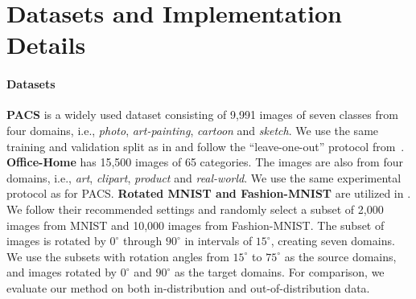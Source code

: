 \documentclass{article} \usepackage[table]{xcolor}
\begin{document}
\section{Datasets and Implementation Details}
\label{appimp}

\paragraph{Datasets}
\textbf{PACS} \citep{li2017deeper} is a widely used dataset consisting of 9,991 images of seven classes from four domains, i.e., \textit{photo}, \textit{art-painting}, \textit{cartoon} and \textit{sketch}. We use the same training and validation split as in \citep{li2017deeper} and follow the ``leave-one-out'' protocol from~\citep{li2017deeper,li2019episodic,carlucci2019domain}. 
\textbf{Office-Home} \citep{venkateswara2017deep} has 15,500 images of 65 categories. The images are also from four domains, i.e., \textit{art}, \textit{clipart}, \textit{product} and \textit{real-world}. We use the same experimental protocol as for PACS. 
\textbf{Rotated MNIST and Fashion-MNIST} are utilized in \cite{piratla2020efficient}.
We follow their recommended settings and randomly select a subset of 2,000 images from MNIST and 10,000 images from Fashion-MNIST. The subset of images is rotated by $0^\circ$ through $90^\circ$ in intervals of $15^\circ$, creating seven domains. We use the subsets with rotation angles from $15^\circ$ to $75^\circ$ as the source domains, and images rotated by $0^\circ$ and $90^\circ$ as the target domains. 
For comparison, we evaluate our method on both in-distribution and out-of-distribution data.

\vspace{-2mm}
\end{document}
